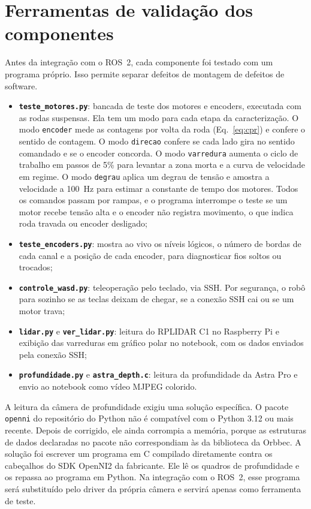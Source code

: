 \section{Ferramentas de validação dos componentes}
\label{sec:bancada}

Antes da integração com o ROS~2, cada componente foi testado com um
programa próprio. Isso permite separar defeitos de montagem de defeitos de
software.

\begin{itemize}
	\item \textbf{\texttt{teste\_motores.py}}: bancada de teste dos
	motores e encoders, executada com as rodas suspensas. Ela tem um modo
	para cada etapa da caracterização. O modo \texttt{encoder} mede as
	contagens por volta da roda (Eq.~\ref{eq:cpr}) e confere o sentido de
	contagem. O modo \texttt{direcao} confere se cada lado gira no sentido
	comandado e se o encoder concorda. O modo \texttt{varredura} aumenta o
	ciclo de trabalho em passos de 5\% para levantar a zona morta e a
	curva de velocidade em regime. O modo \texttt{degrau} aplica um degrau
	de tensão e amostra a velocidade a 100~Hz para estimar a constante de
	tempo dos motores. Todos os comandos passam por rampas, e o programa
	interrompe o teste se um motor recebe tensão alta e o encoder não
	registra movimento, o que indica roda travada ou encoder desligado;
	\item \textbf{\texttt{teste\_encoders.py}}: mostra ao vivo os níveis
	lógicos, o número de bordas de cada canal e a posição de cada
	encoder, para diagnosticar fios soltos ou trocados;
	\item \textbf{\texttt{controle\_wasd.py}}: teleoperação pelo teclado,
	via SSH. Por segurança, o robô para sozinho se as teclas deixam de
	chegar, se a conexão SSH cai ou se um motor trava;
	\item \textbf{\texttt{lidar.py}} e \textbf{\texttt{ver\_lidar.py}}:
	leitura do RPLIDAR C1 no Raspberry Pi e exibição das varreduras em
	gráfico polar no notebook, com os dados enviados pela conexão SSH;
	\item \textbf{\texttt{profundidade.py}} e
	\textbf{\texttt{astra\_depth.c}}: leitura da profundidade da Astra Pro
	e envio ao notebook como vídeo MJPEG colorido.
\end{itemize}

A leitura da câmera de profundidade exigiu uma solução específica. O
pacote \texttt{openni} do repositório do Python não é compatível com o
Python 3.12 ou mais recente. Depois de corrigido, ele ainda corrompia a
memória, porque as estruturas de dados declaradas no pacote não
correspondiam às da biblioteca da Orbbec. A solução foi escrever um
programa em C compilado diretamente contra os cabeçalhos do SDK OpenNI2 da
fabricante. Ele lê os quadros de profundidade e os repassa ao programa em
Python. Na integração com o ROS~2, esse programa será substituído pelo
driver da própria câmera e servirá apenas como ferramenta de teste.

